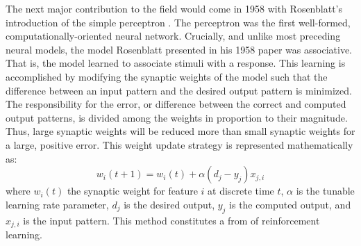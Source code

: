 \documentclass[11pt]{afthesis}
\begin{document}
	The next major contribution to the field would come in 1958 with Rosenblatt's introduction of the simple perceptron \cite{rosenblatt1958perceptron}. The perceptron was the first \cite{anderson1988neurocomputing} well-formed, computationally-oriented neural network. Crucially, and unlike most preceding neural models, the model Rosenblatt presented in his 1958 paper was associative. That is, the model learned to associate stimuli with a response. This learning is accomplished by modifying the synaptic weights of the model such that the difference between an input pattern and the desired output pattern is minimized. The responsibility for the error, or difference between the correct and computed output patterns, is divided among the weights in proportion to their magnitude. Thus, large synaptic weights will be reduced more than small synaptic weights for a large, positive error. This weight update strategy is represented mathematically as: \begin{equation} 
	w_i(t+1) = w_i(t) + \alpha(d_j - y_j)x_{j,i}
	\end{equation} where \begin{math} w_i(t) \end{math} the synaptic weight for feature \begin{math} i \end{math} at discrete time \begin{math} t \end{math}, \begin{math} \alpha \end{math} is the tunable learning rate parameter, \begin{math} d_j \end{math} is the desired output, \begin{math} y_j \end{math} is the computed output, and \begin{math} x_{j,i} \end{math} is the input pattern. This method constitutes a from of reinforcement learning.
	
\end{document}
